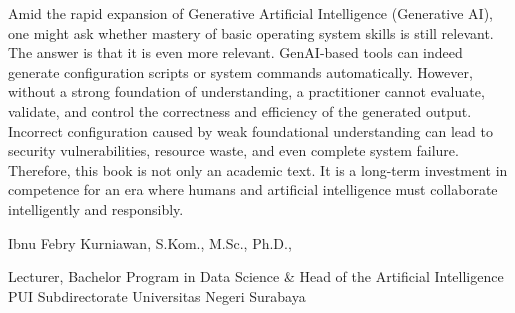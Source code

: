\vspace{1cm}

\noindent
Amid the rapid expansion of Generative Artificial Intelligence (Generative AI), one might ask whether mastery of basic operating system skills is still relevant. The answer is that it is even more relevant. GenAI-based tools can indeed generate configuration scripts or system commands automatically. However, without a strong foundation of understanding, a practitioner cannot evaluate, validate, and control the correctness and efficiency of the generated output. Incorrect configuration caused by weak foundational understanding can lead to security vulnerabilities, resource waste, and even complete system failure. Therefore, this book is not only an academic text. It is a long-term investment in competence for an era where humans and artificial intelligence must collaborate intelligently and responsibly.

\vspace{2cm}

\noindent
Ibnu Febry Kurniawan, S.Kom., M.Sc., Ph.D.,

\vspace{0.5cm}

\noindent
Lecturer, Bachelor Program in Data Science \& Head of the Artificial Intelligence PUI Subdirectorate
Universitas Negeri Surabaya

\vspace{2cm}

\cleardoublepage
